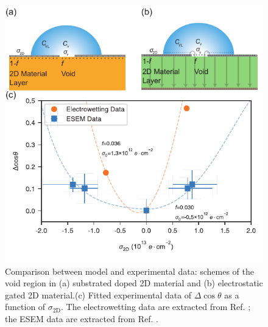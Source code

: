 \documentclass[journal=langd5,manuscript=article,email=true,hyperref=true,keywords=true]{achemso}
\begin{document}
\begin{figure}[htbp]
\centering
\includegraphics[width=0.95\linewidth]{../img/plot-fitting.pdf}
\caption{\label{fig:f-nc-exp} Comparison between model and
  experimental data: schemes of the void region in (a) substrated
  doped 2D material and (b) electrostatic gated 2D material.(c) Fitted
  experimental data of \(\Delta\cos\theta\) as a function of
  \(\sigma_{\mathrm{2D}}\). The electrowetting data are extracted from
  Ref. ; the ESEM data are extracted from
  Ref. .}
\end{figure}
\end{document}
